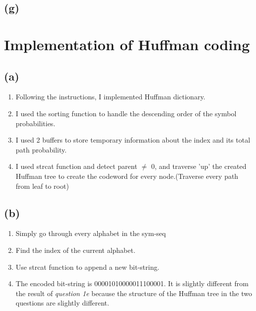 \documentclass{article}
\begin{document}
\begin{CJK*}{UTF8}{bsmi}
\subsection{(g)}

\section{Implementation of Huffman coding}
\subsection{(a)} 
\begin{enumerate}
    \item Following the instructions, I implemented Huffman dictionary.  

    \item I used the sorting function to handle the descending order of the symbol probabilities.
    
    \item I used 2 buffers to store temporary information about the index and its total path probability.
    
    \item I used strcat function and detect parent $\neq$ 0, and traverse 'up' the created Huffman tree to create the codeword for every node.(Traverse every path from leaf to root)

    
\end{enumerate}

\subsection{(b)}
\begin{enumerate}
    \item Simply go through every alphabet in the sym-seq
    \item Find the index of the current alphabet.
    \item Use strcat function to append a new bit-string. 
    \item The encoded bit-string is 00001010000011100001. It is slightly different from the result of \emph{question 1e} because the structure of the Huffman tree in the two questions are slightly different.
\end{enumerate}


\end{CJK*}
\end{document}
